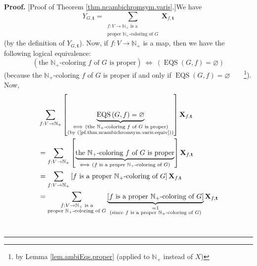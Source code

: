 \documentclass[numbers=enddot,12pt,final,onecolumn,notitlepage]{scrartcl}%
\theoremstyle{definition}
\newenvironment{proof}[1][Proof]{\noindent\textbf{#1.} }{\ \rule{0.5em}{0.5em}}
\newenvironment{verlong}{}{}
\let\sumnonlimits\sum
\renewcommand{\sum}{\sumnonlimits\limits}
\begin{document}
\begin{verlong}
\begin{proof}
[Proof of Theorem \ref{thm.ncambichromsym.varis}.]We have%
\begin{equation}
Y_{G,\mathbf{t}}=\sum_{\substack{f:V\rightarrow\mathbb{N}_{+}\text{ is
a}\\\text{proper }\mathbb{N}_{+}\text{-coloring of }G}}\mathbf{X}%
_{f,\mathbf{t}} \label{pf.thm.ncambichromsym.varis.XG-def}%
\end{equation}
(by the definition of $Y_{G,\mathbf{t}}$). Now, if $f:V\rightarrow
\mathbb{N}_{+}$ is a map, then we have the following logical equivalence:%
\begin{equation}
\left(  \text{the }\mathbb{N}_{+}\text{-coloring }f\text{ of }G\text{ is
proper}\right)  \ \Longleftrightarrow\ \left(  \operatorname*{EQS}\left(
G,f\right)  =\varnothing\right)  \label{pf.thm.ncambichromsym.varis.equiv}%
\end{equation}
(because the $\mathbb{N}_{+}$-coloring $f$ of $G$ is proper if and only if
$\operatorname*{EQS}\left(  G,f\right)  =\varnothing$\ \ \ \ \footnote{by
Lemma \ref{lem.ambiEqs.proper} (applied to $\mathbb{N}_{+}$ instead of $X$)}).
Now,%
\begin{align}
&  \sum_{f:V\rightarrow\mathbb{N}_{+}}\left[  \underbrace{\operatorname*{EQS}%
\left(  G,f\right)  =\varnothing}_{\substack{\Longleftrightarrow\ \left(
\text{the }\mathbb{N}_{+}\text{-coloring }f\text{ of }G\text{ is
proper}\right)  \\\text{(by (\ref{pf.thm.ncambichromsym.varis.equiv}))}%
}}\right]  \mathbf{X}_{f,\mathbf{t}}\nonumber\\
&  =\sum_{f:V\rightarrow\mathbb{N}_{+}}\left[  \underbrace{\text{the
}\mathbb{N}_{+}\text{-coloring }f\text{ of }G\text{ is proper}}%
_{\Longleftrightarrow\ \left(  f\text{ is a proper }\mathbb{N}_{+}%
\text{-coloring of }G\right)  }\right]  \mathbf{X}_{f,\mathbf{t}}\nonumber\\
&  =\sum_{f:V\rightarrow\mathbb{N}_{+}}\left[  f\text{ is a proper }%
\mathbb{N}_{+}\text{-coloring of }G\right]  \mathbf{X}_{f,\mathbf{t}%
}\nonumber\\
&  =\sum_{\substack{f:V\rightarrow\mathbb{N}_{+}\text{ is a}\\\text{proper
}\mathbb{N}_{+}\text{-coloring of }G}}\underbrace{\left[  f\text{ is a proper
}\mathbb{N}_{+}\text{-coloring of }G\right]  }_{\substack{=1\\\text{(since
}f\text{ is a proper }\mathbb{N}_{+}\text{-coloring of }G\text{)}}%
}\mathbf{X}_{f,\mathbf{t}}\nonumber\\

\end{align}
\end{proof}
\end{verlong}
\end{document}
